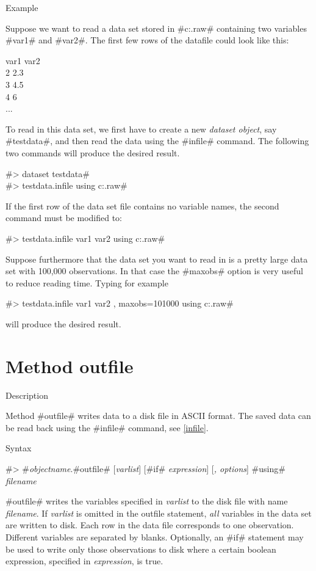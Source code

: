 \begin{stanza}{Example}

{Suppose we want to read a data set stored in
#c:\data\testdata.raw# containing two
variables #var1# and #var2#.
The first few rows of the datafile could look like this:

var1 var2 \\
2 2.3 \\
3 4.5 \\
4 6 \\
...


To read in this data set, we first have to create a new {\em dataset
object}, say #testdata#, and then read the data using
the #infile# command. The following two commands will produce the desired result.

#> dataset testdata# \\
#> testdata.infile using c:\data\testdata.raw#

If the first row of the data set file contains no variable names,
the second command must be modified to:

#> testdata.infile var1 var2 using c:\data\testdata.raw#

Suppose furthermore that the data set you want to read in is a
pretty large data set with 100,000
observations. In that case the #maxobs# option is very useful to reduce reading time.  Typing for example

#> testdata.infile var1 var2 , maxobs=101000 using c:\data\testdata.raw#

will produce the desired result.}
\end{stanza}



\clearpage



\section{Method outfile}
\label{outfile}   

\begin{stanza}{Description}

{Method #outfile# writes data to a disk file in ASCII format. The saved
data can be read back using the #infile# command, see
\autoref{infile}.}
\end{stanza}



\begin{stanza}{Syntax}

{#> #{\em objectname}.#outfile# [{\em varlist}] [#if# {\em expression}] [{\em , options}] #using# {\em filename}

#outfile# writes the variables specified in {\em varlist} to the
disk file with name {\em filename}. If {\em varlist} is omitted in
the outfile statement, {\em all} variables in the data set are
written to disk. Each row in the data file corresponds to one
observation. Different variables are separated by blanks.
Optionally, an #if# statement may be used to write only those
observations to disk where a certain boolean expression, specified
in {\em expression}, is true.}
\end{stanza}


